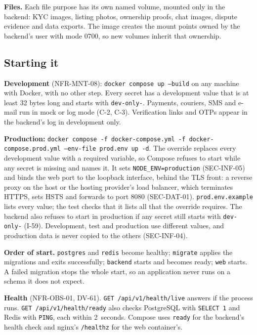 \documentclass[11pt,a4paper]{article}
\begin{document}
\textbf{Files.} Each file purpose has its own named volume, mounted only in the backend: KYC images, listing photos, ownership proofs, chat images, dispute evidence and data exports. The image creates the mount points owned by the backend's user with mode 0700, so new volumes inherit that ownership.

\subsection{Starting it}
\label{sec:start}
\textbf{Development} (NFR-MNT-08): \texttt{docker compose up --build} on any machine with Docker, with no other step. Every secret has a development value that is at least 32 bytes long and starts with \texttt{dev-only-}. Payments, couriers, SMS and e-mail run in mock or log mode (C-2, C-3). Verification links and OTPs appear in the backend's log in development only.

\textbf{Production:} \texttt{docker compose -f docker-compose.\allowbreak yml -f docker-compose.\allowbreak prod.\allowbreak yml --env-file prod.\allowbreak env up -d}. The override replaces every development value with a required variable, so Compose refuses to start while any secret is missing and names it. It sets \texttt{NODE\_\allowbreak ENV=production} (SEC-INF-05) and binds the web port to the loopback interface, behind the TLS front: a reverse proxy on the host or the hosting provider's load balancer, which terminates HTTPS, sets HSTS and forwards to port 8080 (SEC-DAT-01). \texttt{prod.\allowbreak env.\allowbreak example} lists every value; the test checks that it lists all that the override requires. The backend also refuses to start in production if any secret still starts with \texttt{dev-only-} (I-59). Development, test and production use different values, and production data is never copied to the others (SEC-INF-04).

\textbf{Order of start.} \texttt{postgres} and \texttt{redis} become healthy; \texttt{migrate} applies the migrations and exits successfully; \texttt{backend} starts and becomes ready; \texttt{web} starts. A failed migration stops the whole start, so an application never runs on a schema it does not expect.

\textbf{Health} (NFR-OBS-01, DV-61). \texttt{GET /api/v1/health/live} answers if the process runs. \texttt{GET /api/v1/health/ready} also checks PostgreSQL with \texttt{SELECT 1} and Redis with \texttt{PING}, each within 2~seconds. Compose uses \texttt{ready} for the backend's health check and nginx's \texttt{/healthz} for the web container's.
\end{document}
